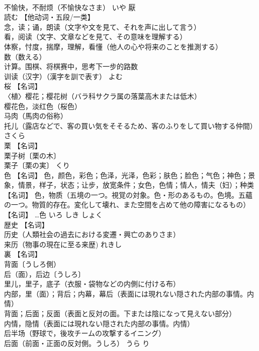 \documentclass[8pt]{extreport}
\begin{document}
\begin{CJK}{UTF8}{min}
\\	不愉快，不耐烦（不愉快なさま）	いや	厭
\\	読む	【他动词・五段/一类】 
\\	念，读；诵，朗读（文字や文を見て、それを声に出して言う） 
\\	看，阅读（文字、文章などを見て、その意味を理解する） 
\\	体察，忖度，揣摩，理解，看懂（他人の心や将来のことを推測する） 
\\	数（数える） 
\\	计算。围棋、将棋赛中，思考下一步的路数 
\\	训读（汉字）（漢字を訓で表す）	よむ	
\\	桜	【名词】 
\\	〈植〉樱花；樱花树（バラ科サクラ属の落葉高木または低木） 
\\	樱花色，淡红色（桜色） 
\\	马肉（馬肉の俗称） 
\\	托儿（露店などで、客の買い気をそそるため、客のふりをして買い物する仲間）	さくら	
\\	栗	【名词】 
\\	栗子树〔栗の木〕 
\\	栗子〔栗の実〕	くり	
\\	色	【名词】 色，颜色，彩色；色泽，光泽，色彩；肤色；脸色；气色；神色；景象，情景，样子，状态；让步，放宽条件；女色，色情；情人，情夫（妇）；种类 【名词】 色，物质（五境の一つ。視覚の対象。色・形のあるもの。色境。五蘊の一つ。物質的存在。変化して壊れ、また空間を占めて他の障害になるもの） 【名词】 …色	いろ しき しょく	
\\	歴史	【名词】 
\\	历史（人類社会の過去における変遷・興亡のありさま） 
\\	来历（物事の現在に至る来歴)	れきし	
\\	裏	【名词】 
\\	背面〔うしろ側） 
\\	后（面），后边〔うしろ〕 
\\	里儿，里子，底子（衣服・袋物などの内側に付ける布） 
\\	内部，里（面）；背后；内幕，幕后（表面には現れない隠された内部の事情。内情） 
\\	背面；后面；反面（表面と反対の面。下または陰になって見えない部分） 
\\	内情，隐情（表面には現れない隠された内部の事情。内情） 
\\	后半场（野球で，後攻チームの攻撃するイニング） 
\\	后面（前面・正面の反対側。うしろ）	うら り	

\end{CJK}
\end{document}
